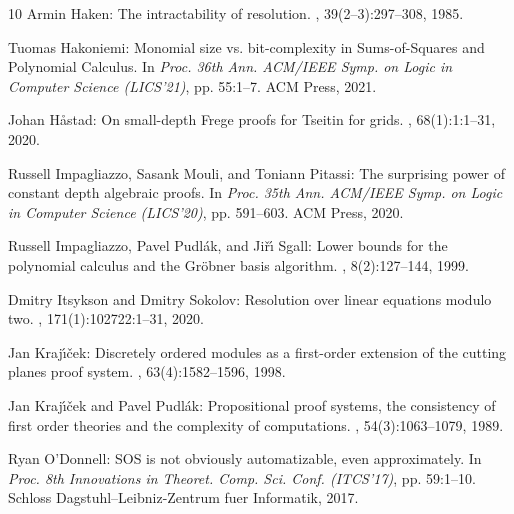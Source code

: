 \documentclass[11pt]{article}
\begin{document}
\begin{thebibliography}{10}
{\sc Armin Haken}: The intractability of resolution.
, 39(2--3):297--308, 1985.
\newblock [\epfmtdoi{10.1016/0304-3975(85)90144-6}]

{\sc Tuomas Hakoniemi}: Monomial size vs. bit-complexity in {Sums-of-Squares}
  and {Polynomial Calculus}.
\newblock In {\em Proc. 36th Ann. ACM/IEEE Symp. on Logic in Computer Science
  (LICS'21)}, pp. 55:1--7. ACM Press, 2021.

{\sc Johan H{\aa}stad}: On small-depth {Frege} proofs for {Tseitin} for grids.
, 68(1):1:1--31, 2020.
\newblock [\epfmtdoi{10.1145/3425606}]

{\sc Russell Impagliazzo, Sasank Mouli, and Toniann Pitassi}: The surprising
  power of constant depth algebraic proofs.
\newblock In {\em Proc. 35th Ann. ACM/IEEE Symp. on Logic in Computer Science
  (LICS'20)}, pp. 591--603. ACM Press, 2020.
\newblock [\epfmtdoi{10.1145/3373718.3394754}]

{\sc Russell Impagliazzo, Pavel Pudl{\'{a}}k, and Ji{\v{r}}{\'{\i}} Sgall}:
  Lower bounds for the polynomial calculus and the {G}r{\"{o}}bner basis
  algorithm.
, 8(2):127--144, 1999.
\newblock [\epfmtdoi{10.1007/s000370050024}]

{\sc Dmitry Itsykson and Dmitry Sokolov}: Resolution over linear equations
  modulo two.
, 171(1):102722:1--31, 2020.

{\sc Jan Kraj{\'{\i}}{\v{c}}ek}: Discretely ordered modules as a first-order
  extension of the cutting planes proof system.
, 63(4):1582--1596, 1998.
\newblock [\epfmtdoi{10.2307/2586668}]

{\sc Jan Kraj\'{\i}{\v c}ek and Pavel Pudl{\'a}k}: Propositional proof systems,
  the consistency of first order theories and the complexity of computations.
, 54(3):1063--1079, 1989.
\newblock [\epfmtdoi{10.2307/2274765}]

{\sc Ryan O'Donnell}: {SOS} is not obviously automatizable, even approximately.
\newblock In {\em Proc. 8th Innovations in Theoret. Comp. Sci. Conf.
  (ITCS'17)}, pp. 59:1--10. Schloss Dagstuhl--Leibniz-Zentrum fuer Informatik,
  2017.


\end{thebibliography}
\end{document}
